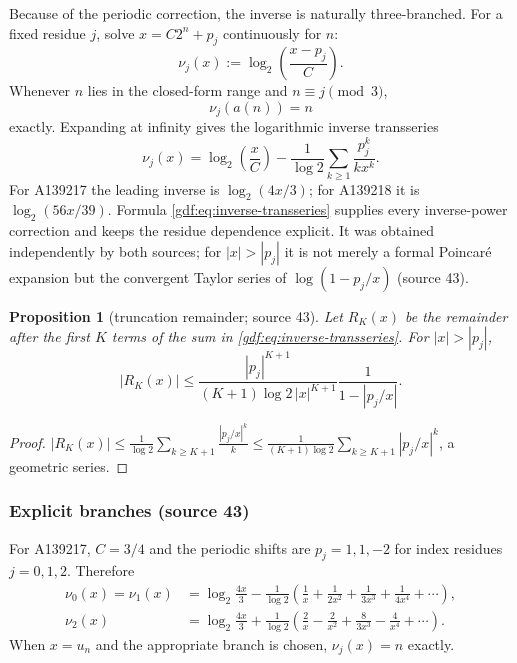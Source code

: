 \documentclass[11pt,a4paper]{article}
\numberwithin{equation}{section}
\newtheorem{proposition}[theorem]{Proposition}
\theoremstyle{definition}
\theoremstyle{remark}
\theoremstyle{plain}
\newcommand{\src}[1]{\textup{(source #1)}}
\begin{document}
Because of the periodic correction, the inverse is naturally three-branched.
For a fixed residue $j$, solve $x=C2^n+p_j$ continuously for $n$:
\begin{equation}\label{gdf:eq:inverse-exact}
 \nu_j(x):=\log_2\left(\frac{x-p_j}{C}\right).
\end{equation}
Whenever $n$ lies in the closed-form range and $n\equiv j\pmod3$,
\begin{equation}\label{gdf:eq:inverse-exact-value}
 \nu_j(a(n))=n
\end{equation}
exactly.  Expanding at infinity gives the logarithmic inverse transseries
\begin{equation}\label{gdf:eq:inverse-transseries}
 \nu_j(x)=\log_2\left(\frac{x}{C}\right)
 -\frac1{\log2}\sum_{k\ge1}\frac{p_j^k}{k x^k}.
\end{equation}
For A139217 the leading inverse is $\log_2(4x/3)$; for A139218 it is
$\log_2(56x/39)$.  Formula \eqref{gdf:eq:inverse-transseries} supplies every
inverse-power correction and keeps the residue dependence explicit.  It was
obtained independently by both sources; for $|x|>|p_j|$ it is not merely a
formal Poincar\'e expansion but the convergent Taylor series of
$\log(1-p_j/x)$ \src{43}.

\begin{proposition}[truncation remainder; source 43]\label{gdf:prop:inverse-remainder}
Let $R_K(x)$ be the remainder after the first $K$ terms of the sum in
\eqref{gdf:eq:inverse-transseries}.  For $|x|>|p_j|$,
\begin{equation}\label{gdf:eq:inverse-remainder}
 \left|R_K(x)\right|
 \le
 \frac{|p_j|^{K+1}}{(K+1)\log2\,|x|^{K+1}}
 \frac{1}{1-|p_j/x|}.
\end{equation}
\end{proposition}

\begin{proof}
$|R_K(x)|\le\frac1{\log2}\sum_{k\ge K+1}\frac{|p_j/x|^k}{k}
\le\frac{1}{(K+1)\log2}\sum_{k\ge K+1}|p_j/x|^k$, a geometric series.
\end{proof}

\subsubsection*{Explicit branches \src{43}}

For A139217, $C=3/4$ and the periodic shifts are $p_j=1,1,-2$ for index
residues $j=0,1,2$.  Therefore
\begin{align}
 \nu_{0}(x)=\nu_{1}(x)
 &=\log_2\frac{4x}{3}
 -\frac1{\log2}\left(
 \frac1x+\frac1{2x^2}+\frac1{3x^3}+\frac1{4x^4}+\cdots\right),\label{gdf:eq:u-inverse-01}\\
 \nu_{2}(x)
 &=\log_2\frac{4x}{3}
 +\frac1{\log2}\left(
 \frac2x-\frac2{x^2}+\frac{8}{3x^3}-\frac4{x^4}+\cdots\right).
 \label{gdf:eq:u-inverse-2}
\end{align}
When $x=u_n$ and the appropriate branch is chosen, $\nu_j(x)=n$ exactly.
\end{document}

